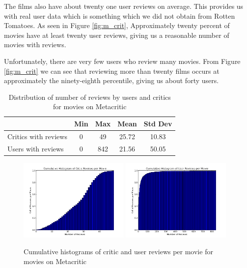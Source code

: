 \documentclass[12pt]{article}
\begin{document}
	The films also have about twenty one user reviews on average. This provides us with real user data which is something which we did not obtain from Rotten Tomatoes. As seen in Figure \ref{fig:m_crit}, Approximately twenty percent of movies have at least twenty user reviews, giving us a reasonable number of movies with reviews.

	Unfortunately, there are very few users who review many movies. From Figure \ref{fig:m_crit} we can see that reviewing more than twenty films occurs at approximately the ninety-eighth percentile, giving us about forty users.

	\begin{table}[H]
	 \centering
	 \caption{Distribution of number of reviews by users and critics for movies on Metacritic}

	 \begin{tabular}{ l | c | c | c | c }
	 \hline 
	 &  Min & Max & Mean & Std Dev  \\
	 \hline
	 Critics with reviews & 0 & 49 & 25.72 & 10.83 \\
	 Users with reviews & 0 & 842 & 21.56 & 50.05 \\
	 \hline
	 \end{tabular}
	 \end{table}

	 \begin{figure}[H]
	    \centering
	    \includegraphics[width=0.48\textwidth]{plots/plot_m_mov_top.png}
	    \includegraphics[width=0.48\textwidth]{plots/plot_m_mov_usr.png}
	    \caption{Cumulative histograms of critic and user reviews per movie for movies on Metacritic}
	    \label{fig:m_mov}
	\end{figure}
\end{document}
